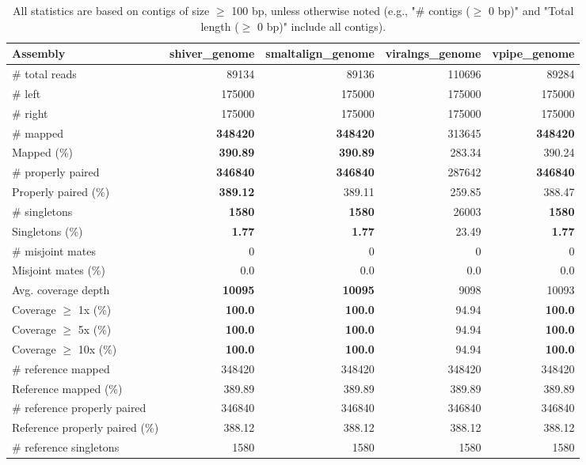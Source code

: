 \documentclass[12pt,a4paper]{article}
\begin{document}
\begin{table}[ht]
\begin{center}
\caption{All statistics are based on contigs of size $\geq$ 100 bp, unless otherwise noted (e.g., "\# contigs ($\geq$ 0 bp)" and "Total length ($\geq$ 0 bp)" include all contigs).}
\begin{tabular}{|l*{4}{|r}|}
\hline
Assembly & shiver\_genome & smaltalign\_genome & viralngs\_genome & vpipe\_genome \\ \hline
\# total reads & 89134 & 89136 & 110696 & 89284 \\ \hline
\# left & 175000 & 175000 & 175000 & 175000 \\ \hline
\# right & 175000 & 175000 & 175000 & 175000 \\ \hline
\# mapped & {\bf 348420} & {\bf 348420} & 313645 & {\bf 348420} \\ \hline
Mapped (\%) & {\bf 390.89} & {\bf 390.89} & 283.34 & 390.24 \\ \hline
\# properly paired & {\bf 346840} & {\bf 346840} & 287642 & {\bf 346840} \\ \hline
Properly paired (\%) & {\bf 389.12} & 389.11 & 259.85 & 388.47 \\ \hline
\# singletons & {\bf 1580} & {\bf 1580} & 26003 & {\bf 1580} \\ \hline
Singletons (\%) & {\bf 1.77} & {\bf 1.77} & 23.49 & {\bf 1.77} \\ \hline
\# misjoint mates & 0 & 0 & 0 & 0 \\ \hline
Misjoint mates (\%) & 0.0 & 0.0 & 0.0 & 0.0 \\ \hline
Avg. coverage depth & {\bf 10095} & {\bf 10095} & 9098 & 10093 \\ \hline
Coverage $\geq$ 1x (\%) & {\bf 100.0} & {\bf 100.0} & 94.94 & {\bf 100.0} \\ \hline
Coverage $\geq$ 5x (\%) & {\bf 100.0} & {\bf 100.0} & 94.94 & {\bf 100.0} \\ \hline
Coverage $\geq$ 10x (\%) & {\bf 100.0} & {\bf 100.0} & 94.94 & {\bf 100.0} \\ \hline
\# reference mapped & 348420 & 348420 & 348420 & 348420 \\ \hline
Reference mapped (\%) & 389.89 & 389.89 & 389.89 & 389.89 \\ \hline
\# reference properly paired & 346840 & 346840 & 346840 & 346840 \\ \hline
Reference properly paired (\%) & 388.12 & 388.12 & 388.12 & 388.12 \\ \hline
\# reference singletons & 1580 & 1580 & 1580 & 1580 \\ \hline

\end{tabular}
\end{center}
\end{table}
\end{document}
